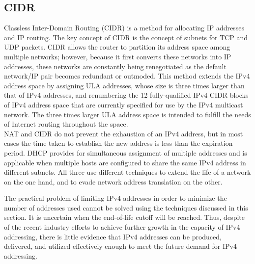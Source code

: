 \documentclass[conference,12pt]{IEEEtran}
\begin{document}
\subsection{CIDR}
Classless Inter-Domain Routing (CIDR) is a method for allocating IP addresses and IP routing. The key concept of CIDR is the concept of subnets for TCP and UDP packets. CIDR allows the router to partition its address space among multiple networks; however, because it first converts these networks into IP addresses, these networks are constantly being renegotiated as the default network/IP pair becomes redundant or outmoded. This method extends the IPv4 address space by assigning ULA addresses, whose size is three times larger than that of IPv4 addresses, and renumbering the 12 fully-qualified IPv4 CIDR blocks of IPv4 address space that are currently specified for use by the IPv4 multicast network. The three times larger ULA address space is intended to fulfill the needs of Internet routing throughout the space.\\

NAT and CIDR do not prevent the exhaustion of an IPv4 address, but in most cases the time taken to establish the new address is less than the expiration period. DHCP provides for simultaneous assignment of multiple addresses and is applicable when multiple hosts are configured to share the same IPv4 address in different subnets. All three use different techniques to extend the life of a network on the one hand, and to evade network address translation on the other.

The practical problem of limiting IPv4 addresses in order to minimize the number of addresses used cannot be solved using the techniques discussed in this section. It is uncertain when the end-of-life cutoff will be reached. Thus, despite of the recent industry efforts to achieve further growth in the capacity of IPv4 addressing, there is little evidence that IPv4 addresses can be produced, delivered, and utilized effectively enough to meet the future demand for IPv4 addressing.
\end{document}
